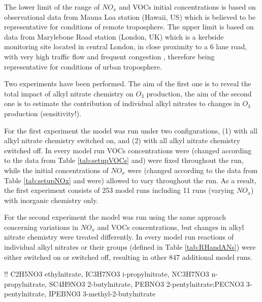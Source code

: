\documentclass[11pt,a4paper]{article}
\begin{document}
The lower limit of the range of $NO_x$ and VOCs initial concentrations is based on observational data from Mauna Loa station (Hawaii, US) which is believed to be representative for conditions of remote troposphere. The upper limit is based on data from 
Marylebone Road station (London, UK) which is a kerbside monitoring site located in central London, in close proximity to a 6 lane road, with very high traffic flow and frequent congestion \citep{VonSchneidemesser2010}, therefore being representative for conditions of urban troposphere.

Two experiments have been performed. The aim of the first one is to reveal the total impact of alkyl nitrate chemistry on $O_3$ production, the aim of the second one is to estimate the contribution of individual alkyl nitrates to changes in $O_3$ production (sensitivity!).

For the first experiment the model was run under two configurations, (1) with all alkyl nitrate chemistry switched on, and (2) with all alkyl nitrate chemistry switched off. In every model run VOCs concentrations were (changed according to the data from Table \ref{tab:setupVOCs} and) were fixed throughout the run, while the initial concentrations of $NO_x$ were (changed according to the data from Table \ref{tab:setupNOx} and were) allowed to vary throughout the run. As a result, the first experiment consists of 253 model runs including 11 runs (varying $NO_x$) with inorganic chemistry only.

For the second experiment the model was run using the same approach concerning variations in $NO_x$ and VOCs concentrations, but changes in alkyl nitrate chemistry were treated differently. In every model run reactions of individual alkyl nitrates or their groups (defined in Table \ref{tab:RHandANs}) were either switched on or switched off, resulting in other 847 additional model runs.

!! C2H5NO3 ethylnitrate, IC3H7NO3 i-propylnitrate, NC3H7NO3  n-propylnitrate, SC4H9NO3 2-butylnitrate, PEBNO3 2-pentylnitrate;PECNO3 3-pentylnitrate, IPEBNO3 3-methyl-2-butylnitrate
\end{document}
